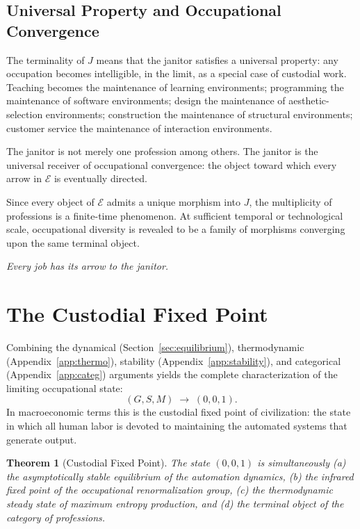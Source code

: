 \documentclass[12pt,a4paper]{article}
\theoremstyle{plain}
\newtheorem{theorem}{Theorem}[section]
\theoremstyle{definition}
\theoremstyle{remark}
\begin{document}
\subsection{Universal Property and Occupational Convergence}

The terminality of $J$ means that the janitor satisfies a universal property:
any occupation becomes intelligible, in the limit, as a special case of
custodial work.  Teaching becomes the maintenance of learning environments;
programming the maintenance of software environments; design the maintenance
of aesthetic-selection environments; construction the maintenance of structural
environments; customer service the maintenance of interaction environments.

The janitor is not merely one profession among others.  The janitor is the
universal receiver of occupational convergence: the object toward which every
arrow in $\mathcal{E}$ is eventually directed.

Since every object of $\mathcal{E}$ admits a unique morphism into $J$, the
multiplicity of professions is a finite-time phenomenon.  At sufficient
temporal or technological scale, occupational diversity is revealed to be a
family of morphisms converging upon the same terminal object.

\bigskip
\begin{center}
\textit{Every job has its arrow to the janitor.}
\end{center}

\section{The Custodial Fixed Point}
\label{app:fixed}

Combining the dynamical (Section~\ref{sec:equilibrium}), thermodynamic
(Appendix~\ref{app:thermo}), stability (Appendix~\ref{app:stability}), and
categorical (Appendix~\ref{app:categ}) arguments yields the complete
characterization of the limiting occupational state:
\[
(G,S,M) \;\longrightarrow\; (0,0,1).
\]
In macroeconomic terms this is the custodial fixed point of civilization:
the state in which all human labor is devoted to maintaining the automated
systems that generate output.

\begin{theorem}[Custodial Fixed Point]
The state $(0,0,1)$ is simultaneously (a) the asymptotically stable
equilibrium of the automation dynamics, (b) the infrared fixed point of the
occupational renormalization group, (c) the thermodynamic steady state of
maximum entropy production, and (d) the terminal object of the category of
professions.
\end{theorem}
\end{document}

